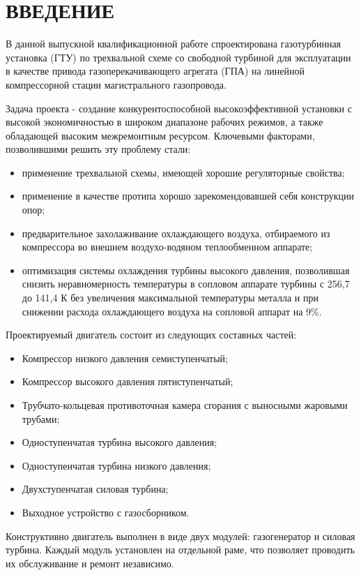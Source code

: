 \section*{ВВЕДЕНИЕ}

В данной выпускной квалификационной работе спроектирована газотурбинная установка
(ГТУ) по трехвальной схеме со свободной турбиной для эксплуатации в качестве привода
газоперекачивающего агрегата (ГПА) на линейной компрессорной стации магистрального
газопровода.

Задача проекта - создание конкурентоспособной высокоэффективной установки с высокой
экономичностью в широком диапазоне рабочих режимов, а также обладающей высоким межремонтным ресурсом.
Ключевыми факторами, позволившими решить эту проблему стали:
\begin{itemize}
    \item применение трехвальной схемы, имеющей хорошие регуляторные свойства;
    \item применение в качестве протипа хорошо зарекомендовавшей себя конструкции опор;
    \item предварительное захолаживание охлаждающего воздуха, отбираемого из компрессора во внешнем воздухо-водяном теплообменном аппарате;
    \item оптимизация системы охлаждения турбины высокого давления, позволившая снизить неравномерность температуры в
    сопловом аппарате турбины с 256,7 до 141,4 К без увеличения максимальной температуры металла и при снижении
    расхода охлаждающего воздуха на сопловой аппарат на 9\%.
\end{itemize}

Проектируемый двигатель состоит из следующих составных частей:
\begin{itemize}
    \item Компрессор низкого давления семиступенчатый;
    \item Компрессор высокого давления пятиступенчатый;
    \item Трубчато-кольцевая противоточная камера сгорания с выносными жаровыми трубами;
    \item Одноступенчатая турбина высокого давления;
    \item Одноступенчатая турбина низкого давления;
    \item Двухступенчатая силовая турбина;
    \item Выходное устройство с газосборником.
\end{itemize}

Конструктивно двигатель выполнен в виде двух модулей: газогенератор и силовая турбина. Каждый модуль установлен на отдельной
раме, что позволяет проводить их обслуживание и ремонт независимо.
